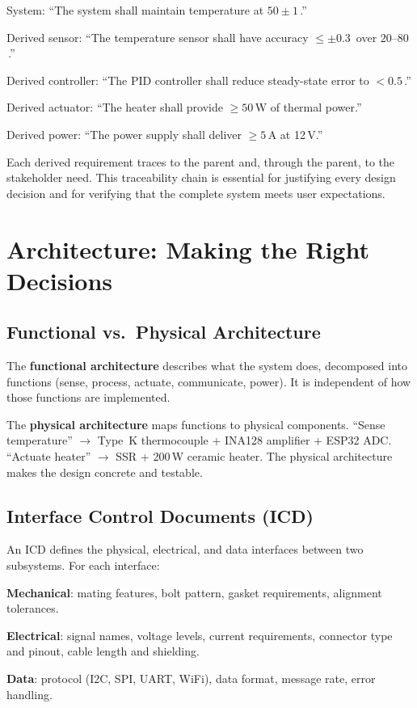 System: ``The system shall maintain temperature at $50 \pm 1$\,\degC{}.''

Derived sensor: ``The temperature sensor shall have accuracy $\leq \pm 0.3$\,\degC{} over $20$--$80$\,\degC{}.''

Derived controller: ``The PID controller shall reduce steady-state error to $< 0.5$\,\degC{}.''

Derived actuator: ``The heater shall provide $\geq 50$\,W of thermal power.''

Derived power: ``The power supply shall deliver $\geq 5$\,A at 12\,V.''

Each derived requirement traces to the parent and, through the parent, to the stakeholder need. This traceability chain is essential for justifying every design decision and for verifying that the complete system meets user expectations.

\section{Architecture: Making the Right Decisions}
\subsection{Functional vs.\ Physical Architecture}
The \textbf{functional architecture} describes what the system does, decomposed into functions (sense, process, actuate, communicate, power). It is independent of how those functions are implemented.

The \textbf{physical architecture} maps functions to physical components. ``Sense temperature'' $\to$ Type~K thermocouple + INA128 amplifier + ESP32 ADC. ``Actuate heater'' $\to$ SSR + 200\,W ceramic heater. The physical architecture makes the design concrete and testable.

\subsection{Interface Control Documents (ICD)}
An ICD defines the physical, electrical, and data interfaces between two subsystems. For each interface:

\textbf{Mechanical}: mating features, bolt pattern, gasket requirements, alignment tolerances.

\textbf{Electrical}: signal names, voltage levels, current requirements, connector type and pinout, cable length and shielding.

\textbf{Data}: protocol (I2C, SPI, UART, WiFi), data format, message rate, error handling.

